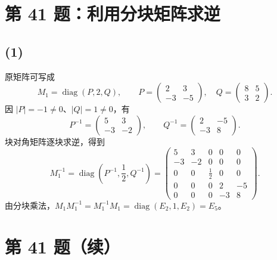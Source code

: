 \documentclass[11pt,a4paper,fontset=fandol]{ctexart}
\newcommand{\ans}[1]{\boxed{#1}}
\newcommand{\diag}{\operatorname{diag}}
\newcommand{\problem}[1]{\Needspace{8\baselineskip}\section*{#1}}
\begin{document}
\problem{第 41 题：利用分块矩阵求逆}
\subsection*{(1)}
原矩阵可写成
\[
M_1=\diag(P,2,Q),\qquad
P=\begin{pmatrix}2&3\\-3&-5\end{pmatrix},\quad
Q=\begin{pmatrix}8&5\\3&2\end{pmatrix}.
\]
因 $|P|=-1\ne0$、$|Q|=1\ne0$，有
\[
P^{-1}=\begin{pmatrix}5&3\\-3&-2\end{pmatrix},
\qquad
Q^{-1}=\begin{pmatrix}2&-5\\-3&8\end{pmatrix}.
\]
块对角矩阵逐块求逆，得到
\[
\ans{M_1^{-1}=\diag\left(P^{-1},\frac12,Q^{-1}\right)
=\begin{pmatrix}
5&3&0&0&0\\
-3&-2&0&0&0\\
0&0&\frac12&0&0\\
0&0&0&2&-5\\
0&0&0&-3&8
\end{pmatrix}}.
\]
由分块乘法，$M_1M_1^{-1}=M_1^{-1}M_1=\diag(E_2,1,E_2)=E_5$。

\newpage
\section*{第 41 题（续）}
\end{document}
